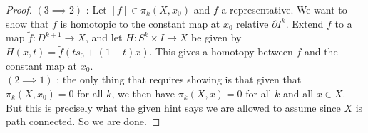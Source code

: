 \begin{proof}
        \linebreak
        $(3 \implies 2)$ : 
        Let $\left[ f \right] \in \pi_k(X, x_0)$ and
        $f$ a representative. 
        We want to show that $f$ is homotopic to the
        constant map at $x_0$ relative $\partial I^{k}$.
        Extend $f$ to a map 
        $\tilde{f} \colon D^{k+1} \to X$, and let
        $H \colon S^{k} \times I \to X$ be given by
        $H\left( x,t \right) =
        \tilde{f}\left( ts_0 + (1-t) x \right) $. This gives
        a homotopy between $f$ and the constant map
        at  $x_0$.\\
        \linebreak
        $\left( 2 \implies 1 \right) $ : the only thing that
        requires showing is that
        given that $\pi_k(X, x_0) = 0$ for all $k$, we then
        have $\pi_k \left( X, x \right) = 0$ for all $k$ and
        all $x \in X$. But this is precisely what the given
        hint says we are allowed to assume since
        $X$ is path connected. So we are done.
    \end{proof}





